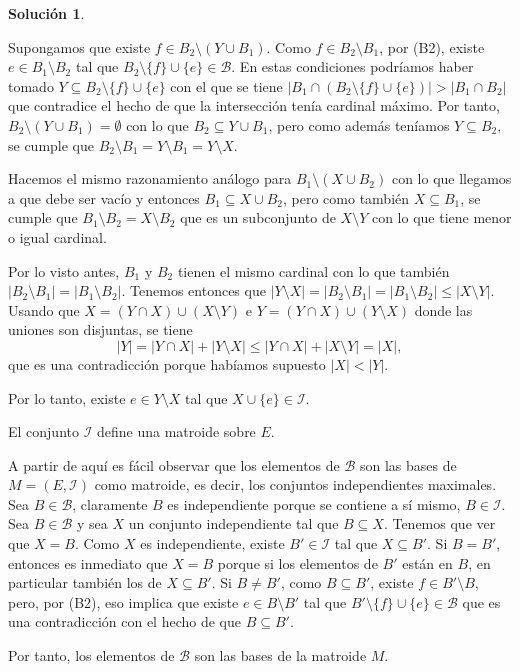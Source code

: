 \documentclass[10pt]{article}
\theoremstyle{definition}
\newtheorem*{sol}{Solución}
\begin{document}
\begin{sol}
\begin{enumerate}[labelindent=\parindent, label=(I\arabic*), ref=\arabic*]
Supongamos que existe $f\in B_2\setminus(Y\cup B_1)$. Como $f\in B_2\setminus B_1$, por (B2), existe $e\in B_1\setminus B_2$ tal que $B_2\setminus \{f\}\cup\{e\}\in\mathcal{B}.$ En estas condiciones podríamos haber tomado $Y\subseteq B_2\setminus \{f\}\cup\{e\}$ con el que se tiene $|B_1\cap (B_2\setminus \{f\}\cup\{e\})|>|B_1\cap B_2|$ que contradice el hecho de que la intersección tenía cardinal máximo. Por tanto, $B_2\setminus (Y\cup B_1)=\emptyset$ con lo que $B_2\subseteq Y\cup B_1$, pero como además teníamos $Y\subseteq B_2$, se cumple que $B_2\setminus B_1=Y\setminus B_1=Y\setminus X$.

Hacemos el mismo razonamiento análogo para $B_1\setminus (X\cup B_2)$ con lo que llegamos a que debe ser vacío y entonces $B_1\subseteq X\cup B_2$, pero como también $X\subseteq B_1$, se cumple que $B_1\setminus B_2=X\setminus B_2$ que es un subconjunto de $X\setminus Y$ con lo que tiene menor o igual cardinal.

Por lo visto antes, $B_1$ y $B_2$ tienen el mismo cardinal con lo que también $|B_2\setminus B_1|=|B_1\setminus B_2|$. Tenemos entonces que 
$|Y\setminus X|=|B_2\setminus B_1|=|B_1\setminus B_2|\leq |X\setminus Y|$. Usando que $X=(Y\cap X)\cup (X\setminus Y)$ e $Y=(Y\cap X)\cup(Y\setminus X)$ donde las uniones son disjuntas, se tiene
$$|Y|=|Y\cap X|+|Y\setminus X|\leq |Y\cap X|+|X\setminus Y|=|X|,$$
que es una contradicción porque habíamos supuesto $|X|<|Y|$.

Por lo tanto, existe $e\in Y\setminus X$ tal que $X\cup\{e\}\in\mathcal{I}$.
\end{enumerate}
El conjunto $\mathcal{I}$ define una matroide sobre $E$.

A partir de aquí es fácil observar que los elementos de $\mathcal{B}$ son las bases de $M=(E,\mathcal{I})$ como matroide, es decir, los conjuntos independientes maximales. Sea $B\in\mathcal{B}$, claramente $B$ es independiente porque se contiene a sí mismo, $B\in\mathcal{I}$. Sea $B\in\mathcal{B}$ y sea $X$ un conjunto independiente tal que $B\subseteq X$. Tenemos que ver que $X=B$. Como $X$ es independiente, existe $B'\in\mathcal{I}$ tal que $X\subseteq B'$. Si $B=B'$, entonces es inmediato que $X=B$ porque si los elementos de $B'$ están en $B$, en particular también los de $X\subseteq B'$. Si $B\neq B'$, como $B\subseteq B'$, existe $f\in B'\setminus B$, pero, por (B2), eso implica que existe $e\in B\setminus B'$ tal que $B'\setminus\{f\}\cup\{e\}\in\mathcal{B}$ que es una contradicción con el hecho de que $B\subseteq B'$.

Por tanto, los elementos de $\mathcal{B}$ son las bases de la matroide $M$.
\end{sol}
\end{document}
